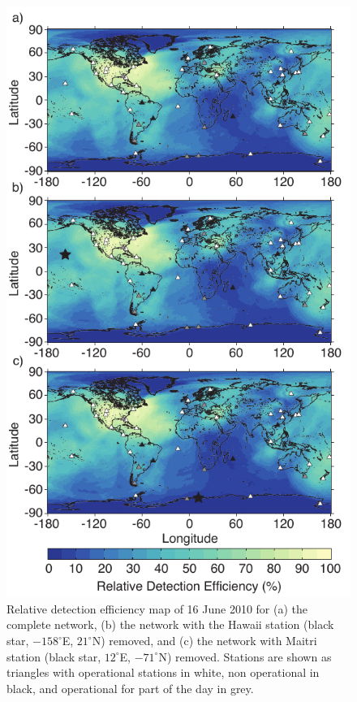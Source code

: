 \begin{figure}[ht!]
   \centering
\noindent\includegraphics[scale=0.8]{efficiency/Figures/2012RS005049-p12.pdf}
   \caption{Relative detection efficiency map of 16 June 2010  for (a) the complete network, (b) the network with the Hawaii station (black star, $-158^\circ$E, $21^\circ$N) removed, and (c) the network with Maitri station (black star, $12^\circ$E, $-71^\circ$N) removed.
Stations are shown as triangles with operational stations in white, non operational in black, and operational for part of the day in grey.}
   \label{efficiency:fig:scrubMap}
\end{figure}

